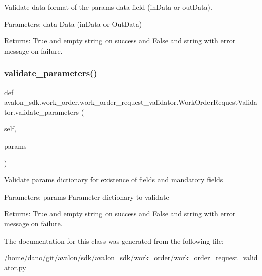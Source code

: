 \begin{DoxyVerb}Validate data format of the params data field (inData or outData).

Parameters:
data    Data (inData or OutData)

Returns:
True and empty string on success and
False and string with error message on failure.
\end{DoxyVerb}
 \mbox{\label{classavalon__sdk_1_1work__order_1_1work__order__request__validator_1_1WorkOrderRequestValidator_af3b472fe7ef9d4c7c4f0497767d56f40}} 
\subsubsection{\texorpdfstring{validate\+\_\+parameters()}{validate\_parameters()}}
{\footnotesize\ttfamily def avalon\+\_\+sdk.\+work\+\_\+order.\+work\+\_\+order\+\_\+request\+\_\+validator.\+Work\+Order\+Request\+Validator.\+validate\+\_\+parameters (\begin{DoxyParamCaption}\item[{}]{self,  }\item[{}]{params }\end{DoxyParamCaption})}

\begin{DoxyVerb}Validate params dictionary for existence of
fields and mandatory fields

Parameters:
params    Parameter dictionary to validate

Returns:
True and empty string on success and
False and string with error message on failure.
\end{DoxyVerb}
 

The documentation for this class was generated from the following file\+:\begin{DoxyCompactItemize}
\item 
/home/dano/git/avalon/sdk/avalon\+\_\+sdk/work\+\_\+order/work\+\_\+order\+\_\+request\+\_\+validator.\+py\end{DoxyCompactItemize}

